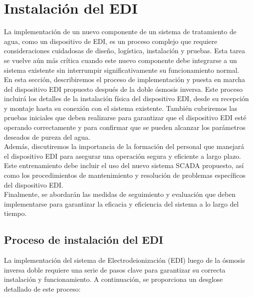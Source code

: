 \section{Instalación del EDI }
\label{sec:implementation_start}

La implementación de un nuevo componente de un sistema de tratamiento de agua,
como un dispositivo de EDI, es un proceso complejo que requiere consideraciones
cuidadosas de diseño, logística, instalación y pruebas. Esta tarea se vuelve
aún más crítica cuando este nuevo componente debe integrarse a un sistema
existente sin interrumpir significativamente su funcionamiento normal.\\

En esta sección, describiremos el proceso de implementación y puesta en marcha del dispositivo EDI propuesto después de la doble ósmosis inversa. Este proceso incluirá los detalles de la instalación física del dispositivo EDI, desde su recepción y montaje hasta su conexión con el sistema existente. También cubriremos las pruebas iniciales que deben realizarse para garantizar que el dispositivo EDI esté operando correctamente y para confirmar que se pueden alcanzar los parámetros deseados de pureza del agua.\\

Además, discutiremos la importancia de la formación del personal que manejará el dispositivo EDI para asegurar una operación segura y eficiente a largo plazo. Este entrenamiento debe incluir el uso del nuevo sistema SCADA propuesto, así como los procedimientos de mantenimiento y resolución de problemas específicos del dispositivo EDI. \\

Finalmente, se abordarán las medidas de seguimiento y evaluación que deben implementarse para garantizar la eficacia y eficiencia del sistema a lo largo del tiempo.\\

\subsection{Proceso de instalación del EDI}

La implementación del sistema de Electrodeionización (EDI) luego de la ósmosis inversa doble requiere una serie de pasos clave para garantizar su correcta instalación y funcionamiento. A continuación, se proporciona un desglose detallado de este proceso:

